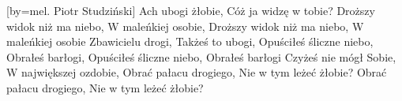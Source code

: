 [by={mel. Piotr Studziński}]
\beginverse
Ach ubogi żłobie,
Cóż ja widzę w tobie?
Droższy widok niż ma niebo,
W maleńkiej osobie,
Droższy widok niż ma niebo,
W maleńkiej osobie
\endverse
\beginverse
Zbawicielu drogi,
Takżeś to ubogi,
Opuściłeś śliczne niebo,
Obrałeś barłogi,
Opuściłeś śliczne niebo,
Obrałeś barłogi
\endverse
\beginverse
Czyżeś nie mógł Sobie,
W największej ozdobie,
Obrać pałacu drogiego,
Nie w tym leżeć żłobie?
Obrać pałacu drogiego,
Nie w tym leżeć żłobie?
\endverse
\endsong
